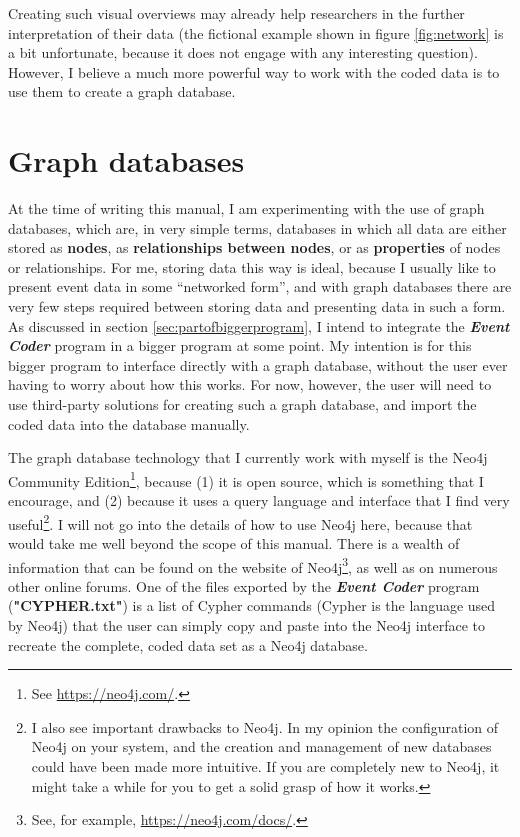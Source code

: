 \documentclass{memoir}
\begin{document}
Creating such visual overviews may already help researchers in the further interpretation of their data (the fictional example shown in figure \ref{fig:network} is a bit unfortunate, because it does not engage with any interesting question). However, I believe a much more powerful way to work with the coded data is to use them to create a graph database. 

\section{Graph databases}
\label{sec:graphdatabases}

At the time of writing this manual, I am experimenting with the use of graph databases, which are, in very simple terms, databases in which all data are either stored as \textbf{nodes}, as \textbf{relationships between nodes}, or as \textbf{properties} of nodes or relationships. For me, storing data this way is ideal, because I usually like to present event data in some ``networked form'', and with graph databases there are very few steps required between storing data and presenting data in such a form. As discussed in section \ref{sec:partofbiggerprogram}, I intend to integrate the \textbf{\emph{Event Coder}} program in a bigger program at some point. My intention is for this bigger program to interface directly with a graph database, without the user ever having to worry about how this works. For now, however, the user will need to use third-party solutions for creating such a graph database, and import the coded data into the database manually.

The graph database technology that I currently work with myself is the Neo4j Community Edition\footnote{See \url{https://neo4j.com/}.}, because (1) it is open source, which is something that I encourage, and (2) because it uses a query language and interface that I find very useful\footnote{I also see important drawbacks to Neo4j. In my opinion the configuration of Neo4j on your system, and the creation and management of new databases could have been made more intuitive. If you are completely new to Neo4j, it might take a while for you to get a solid grasp of how it works.}. I will not go into the details of how to use Neo4j here, because that would take me well beyond the scope of this manual. There is a wealth of information that can be found on the website of Neo4j\footnote{See, for example, \url{https://neo4j.com/docs/}.}, as well as on numerous other online forums. One of the files exported by the \emph{\textbf{Event Coder}} program (\textbf{"CYPHER.txt"}) is a list of Cypher commands (Cypher is the language used by Neo4j) that the user can simply copy and paste into the Neo4j interface to recreate the complete, coded data set as a Neo4j database.    
\end{document}
